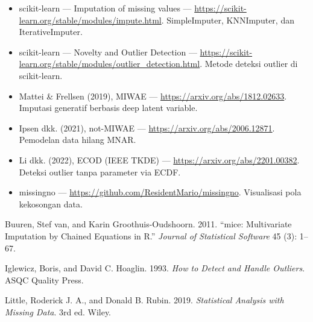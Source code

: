 \begin{bacaan}

\begin{itemize}
\tightlist
\item
  scikit-learn --- Imputation of missing values --- \url{https://scikit-learn.org/stable/modules/impute.html}. SimpleImputer, KNNImputer, dan IterativeImputer.
\item
  scikit-learn --- Novelty and Outlier Detection --- \url{https://scikit-learn.org/stable/modules/outlier_detection.html}. Metode deteksi outlier di scikit-learn.
\item
  Mattei \& Frellsen (2019), MIWAE --- \url{https://arxiv.org/abs/1812.02633}. Imputasi generatif berbasis deep latent variable.
\item
  Ipsen dkk. (2021), not-MIWAE --- \url{https://arxiv.org/abs/2006.12871}. Pemodelan data hilang MNAR.
\item
  Li dkk. (2022), ECOD (IEEE TKDE) --- \url{https://arxiv.org/abs/2201.00382}. Deteksi outlier tanpa parameter via ECDF.
\item
  missingno --- \url{https://github.com/ResidentMario/missingno}. Visualisasi pola kekosongan data.
\end{itemize}

\end{bacaan}

\rujukanheading

\protect{}\label{refs}
\begin{CSLReferences}{1}{1}
Buuren, Stef van, and Karin Groothuis-Oudshoorn. 2011. {``{mice}: Multivariate Imputation by Chained Equations in {R}.''} \emph{Journal of Statistical Software} 45 (3): 1--67.

Iglewicz, Boris, and David C. Hoaglin. 1993. \emph{How to Detect and Handle Outliers}. ASQC Quality Press.

Little, Roderick J. A., and Donald B. Rubin. 2019. \emph{Statistical Analysis with Missing Data}. 3rd ed. Wiley.

\end{CSLReferences}

